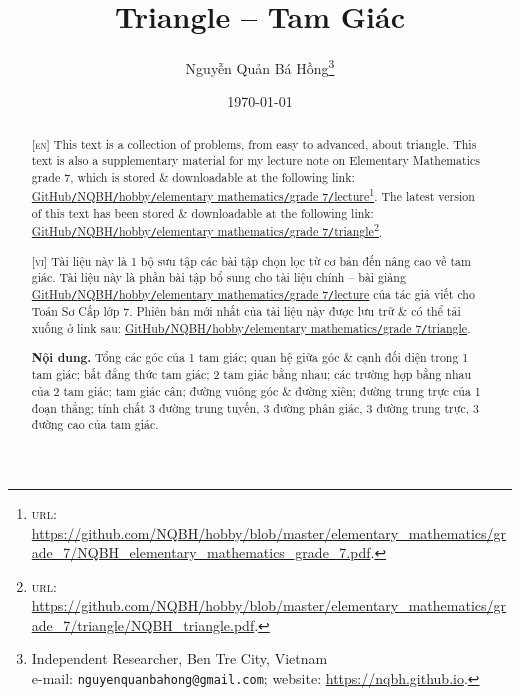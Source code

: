 \documentclass{article}
\title{Triangle -- Tam Giác}
\author{Nguyễn Quản Bá Hồng\footnote{Independent Researcher, Ben Tre City, Vietnam\\e-mail: \texttt{nguyenquanbahong@gmail.com}; website: \url{https://nqbh.github.io}.}}
\date{\today}
\numberwithin{equation}{section}
\begin{document}
\maketitle
\begin{abstract}
	\textsc{[en]} This text is a collection of problems, from easy to advanced, about triangle. This text is also a supplementary material for my lecture note on Elementary Mathematics grade 7, which is stored \& downloadable at the following link: \href{https://github.com/NQBH/hobby/blob/master/elementary_mathematics/grade_7/NQBH_elementary_mathematics_grade_7.pdf}{GitHub\texttt{/}NQBH\texttt{/}hobby\texttt{/}elementary mathematics\texttt{/}grade 7\texttt{/}lecture}\footnote{\textsc{url}: \url{https://github.com/NQBH/hobby/blob/master/elementary_mathematics/grade_7/NQBH_elementary_mathematics_grade_7.pdf}.}. The latest version of this text has been stored \& downloadable at the following link: \href{https://github.com/NQBH/hobby/blob/master/elementary_mathematics/grade_7/triangle/NQBH_triangle.pdf}{GitHub\texttt{/}NQBH\texttt{/}hobby\texttt{/}elementary mathematics\texttt{/}grade 7\texttt{/}triangle}\footnote{\textsc{url}: \url{https://github.com/NQBH/hobby/blob/master/elementary_mathematics/grade_7/triangle/NQBH_triangle.pdf}.}.
	\vspace{2mm}
	
	\textsc{[vi]} Tài liệu này là 1 bộ sưu tập các bài tập chọn lọc từ cơ bản đến nâng cao về tam giác. Tài liệu này là phần bài tập bổ sung cho tài liệu chính -- bài giảng \href{https://github.com/NQBH/hobby/blob/master/elementary_mathematics/grade_7/NQBH_elementary_mathematics_grade_7.pdf}{GitHub\texttt{/}NQBH\texttt{/}hobby\texttt{/}elementary mathematics\texttt{/}grade 7\texttt{/}lecture} của tác giả viết cho Toán Sơ Cấp lớp 7. Phiên bản mới nhất của tài liệu này được lưu trữ \& có thể tải xuống ở link sau: \href{https://github.com/NQBH/hobby/blob/master/elementary_mathematics/grade_7/triangle/NQBH_triangle.pdf}{GitHub\texttt{/}NQBH\texttt{/}hobby\texttt{/}elementary mathematics\texttt{/}grade 7\texttt{/}triangle}.
	
	\textsf{\textbf{Nội dung.} Tổng các góc của 1 tam giác; quan hệ giữa góc \& cạnh đối diện trong 1 tam giác; bất đẳng thức tam giác; 2 tam giác bằng nhau; các trường hợp bằng nhau của 2 tam giác; tam giác cân; đường vuông góc \& đường xiên; đường trung trực của 1 đoạn thẳng; tính chất 3 đường trung tuyến, 3 đường phân giác, 3 đường trung trực, 3 đường cao của tam giác.}
\end{abstract}
\setcounter{secnumdepth}{4}
\setcounter{tocdepth}{3}
\tableofcontents
\end{document}
